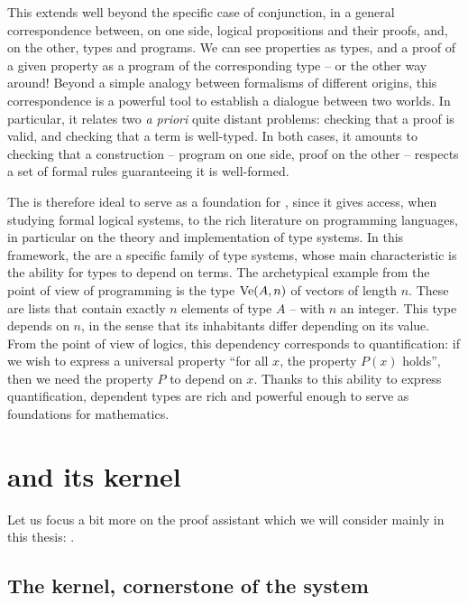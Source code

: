 This extends well beyond the specific case of conjunction, in a general correspondence
between, on one side, logical propositions and their proofs, and, on the other, types and programs.
We can see properties as types, and a proof of a given property as a program of the
corresponding type – or the other way around!
Beyond a simple analogy between formalisms of different origins, this correspondence
is a powerful tool to establish a dialogue between two worlds. In particular, it
relates two \textit{a priori} quite distant problems: checking that a proof
is valid, and checking that a term is well-typed. In both cases, it amounts to checking that
a construction – program on one side, proof on the other – respects a set of formal
rules guaranteeing it is well-formed.

The  is therefore ideal to serve as a foundation for
, since it gives access, when studying formal logical systems,
to the rich literature on programming languages, in particular on the theory and
implementation of type systems. In this framework, the
 are a specific family of type systems,
whose main characteristic is the ability for types to depend on terms. The archetypical
example from the point of view of programming is the type $\operatorname{Ve}(A,n)$
of vectors of length $n$. These are lists that contain exactly $n$ elements of type $A$ – with
$n$ an integer.
This type depends on $n$, in the sense that its inhabitants differ depending on its value.
From the point of view of logics, this dependency corresponds to quantification: if we
wish to express a universal property “for all $x$, the property $P(x)$ holds”, then we need
the property $P$ to depend on $x$.
Thanks to this ability to express quantification, dependent types are rich and powerful enough
to serve as foundations for mathematics.

\section{ and its kernel}
\label{sec:intro-coq-en}

Let us focus a bit more on the proof assistant which we will consider mainly in this
thesis: .

\subsection[The kernel]{The kernel, cornerstone of the system}

